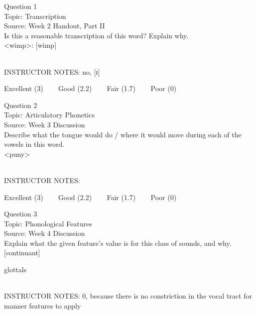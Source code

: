 \documentclass[12pt]{article}
\begin{document}
\begin{center}
\textbf{{\color{blue}{\HUGE START OF EXAM\\}}}

\textbf{{\color{blue}{\HUGE Student ID: 19711\\}}}

\textbf{{\color{blue}{\HUGE \\}}}

\end{center}
\newpage

{\large Question 1}\\

Topic: Transcription\\
Source: Week 2 Handout, Part II\\

Is this a reasonable transcription of this word? Explain why.\\

<wimp>: {[wimp]}


~\\
INSTRUCTOR NOTES: no, [ɪ]


\vfill
Excellent (3) ~~~ Good (2.2) ~~~ Fair (1.7) ~~~ Poor (0)
\newpage

{\large Question 2}\\

Topic: Articulatory Phonetics\\
Source: Week 3 Discussion\\

Describe what the tongue would do / where it would move during each of the vowels in this word.\\

<puny>


~\\
INSTRUCTOR NOTES: 


\vfill
Excellent (3) ~~~ Good (2.2) ~~~ Fair (1.7) ~~~ Poor (0)
\newpage

{\large Question 3}\\

Topic: Phonological Features\\
Source: Week 4 Discussion\\

Explain what the given feature’s value is for this class of sounds, and why.\\

{[continuant]}

glottals


~\\
INSTRUCTOR NOTES: 0, because there is no constriction in the vocal tract for manner features to apply
\end{document}

